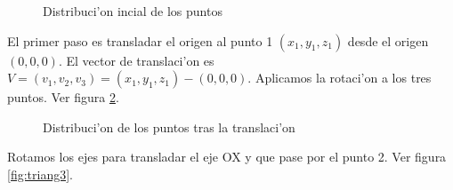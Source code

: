 \begin{figure}[h!]
	\begin{center}
     	\end{center}
    	\caption{Distribuci'on incial de los puntos}\label{fig:triang1}
\end{figure}


El primer paso es transladar el origen al punto 1 $(x_1,y_1,z_1)$ desde el origen $(0,0,0)$. El vector de translaci'on es $V = (v_1,v_2,v_3) = (x_1,y_1,z_1) - (0, 0, 0)$. Aplicamos la rotaci'on a los tres puntos. Ver figura \ref{fig:triang2}.

\begin{figure}[h!]
	\begin{center}
     	\end{center}
    	\caption{Distribuci'on de los puntos tras la translaci'on}\label{fig:triang2}
\end{figure}

Rotamos los ejes para transladar el eje OX y que pase por el punto 2.
Ver figura \ref{fig:triang3}.


